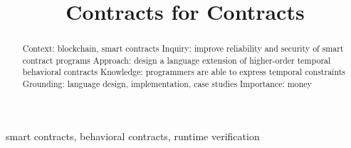 \documentclass[10pt,conference]{IEEEtran}
\begin{document}
\title{Contracts for Contracts}

\author{ }


\maketitle


\begin{abstract}
  Context: blockchain, smart contracts
    Inquiry: improve reliability and security of smart contract programs
    Approach: design a language extension of higher-order temporal behavioral contracts
    Knowledge: programmers are able to express temporal constraints
    Grounding: language design, implementation, case studies
    Importance: money
\end{abstract}

\begin{IEEEkeywords}
  smart contracts, behavioral contracts, runtime verification
\end{IEEEkeywords}













\end{document}
